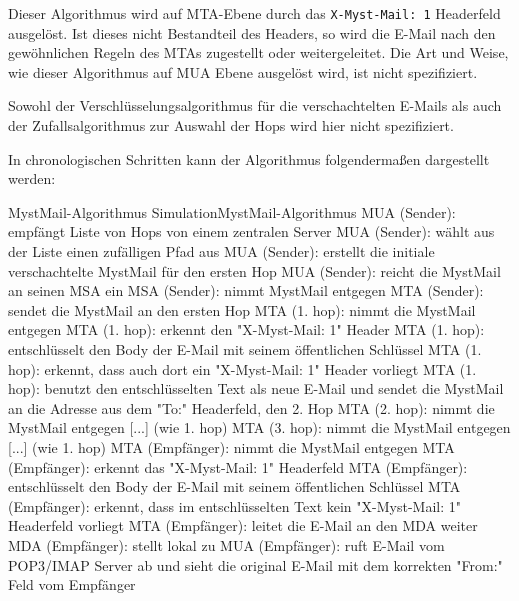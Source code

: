Dieser Algorithmus wird auf MTA-Ebene durch das \verb#X-Myst-Mail: 1# Headerfeld ausgelöst. Ist dieses nicht Bestandteil des Headers, so wird die E-Mail nach den gewöhnlichen Regeln des MTAs zugestellt oder weitergeleitet. Die Art und Weise, wie dieser Algorithmus auf MUA Ebene ausgelöst wird, ist nicht spezifiziert.

Sowohl der Verschlüsselungsalgorithmus für die verschachtelten E-Mails als auch der Zufallsalgorithmus zur Auswahl der Hops wird hier nicht spezifiziert.

In chronologischen Schritten kann der Algorithmus folgendermaßen dargestellt werden:\\

\begin{minipage}{\linewidth}
\begin{mail}{MystMail-Algorithmus Simulation}{MystMail-Algorithmus}
MUA (Sender): empfängt Liste von Hops von einem zentralen
              Server
MUA (Sender): wählt aus der Liste einen zufälligen Pfad aus
MUA (Sender): erstellt die initiale verschachtelte MystMail
              für den ersten Hop
MUA (Sender): reicht die MystMail an seinen MSA ein
MSA (Sender): nimmt MystMail entgegen
MTA (Sender): sendet die MystMail an den ersten Hop
MTA (1. hop): nimmt die MystMail entgegen
MTA (1. hop): erkennt den "X-Myst-Mail: 1" Header
MTA (1. hop): entschlüsselt den Body der E-Mail mit seinem
              öffentlichen Schlüssel
MTA (1. hop): erkennt, dass auch dort ein "X-Myst-Mail: 1"
              Header vorliegt
MTA (1. hop): benutzt den entschlüsselten Text als neue E-Mail
              und sendet die MystMail an die Adresse aus dem
              "To:" Headerfeld, den 2. Hop
MTA (2. hop): nimmt die MystMail entgegen
[...] (wie 1. hop)
MTA (3. hop): nimmt die MystMail entgegen
[...] (wie 1. hop)
MTA (Empfänger): nimmt die MystMail entgegen
MTA (Empfänger): erkennt das "X-Myst-Mail: 1" Headerfeld
MTA (Empfänger): entschlüsselt den Body der E-Mail mit seinem
                 öffentlichen Schlüssel
MTA (Empfänger): erkennt, dass im entschlüsselten Text kein
                 "X-Myst-Mail: 1" Headerfeld vorliegt
MTA (Empfänger): leitet die E-Mail an den MDA weiter
MDA (Empfänger): stellt lokal zu
MUA (Empfänger): ruft E-Mail vom POP3/IMAP Server ab
                 und sieht die original E-Mail
                 mit dem korrekten "From:" Feld vom Empfänger
\end{mail}
\end{minipage}

